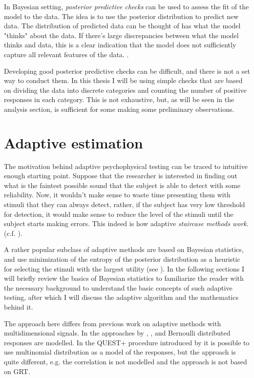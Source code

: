 \documentclass{article}\usepackage{knitr}
\begin{document}
In Bayesian setting, \textit{posterior predictive checks} can be used to assess the fit of the model to the data. The idea is to use the posterior distribution to predict new data. The distribution of predicted data can be thought of has what the model "thinks" about the data. If there's large discrepancies between what the model thinks and data, this is a clear indication that the model does not sufficiently capture all relevant features of the data. \citep[Chapter 7]{bda}.

Developing good posterior predictive checks can be difficult, and there is not a set way to conduct them. In this thesis I will be using simple checks that are based on dividing the data into discrete categories and counting the number of positive responses in each category. This is not exhaustive, but, as will be seen in the analysis section, is sufficient for some making some preliminary observations. 


\newpage


\section{Adaptive estimation}

The motivation behind adaptive psychophysical testing can be traced to intuitive enough starting point. Suppose that the researcher is interested in finding out what is the faintest possible sound that the subject is able to detect with some reliability. Now, it wouldn't make sense to waste time presenting them with stimuli that they can always detect, rather, if the subject has very low threshold for detection, it would make sense to reduce the level of the stimuli until the subject starts making errors. This indeed is how adaptive \textit{staircase methods work}. (c.f. \citet[Chapter 5]{kingdomprins2010}).

A rather popular subclass of adaptive methods are based on Bayesian statistics, and use minimization of the entropy of the posterior distribution as a heuristic for selecting the stimuli with the largest utility (see \citet{kontsevichtyler1999}). In the following sections I will briefly review the basics of Bayesian statistics to familiarize the reader with the necessary background to understand the basic concepts of such adaptive testing, after which I will discuss the adaptive algorithm and the mathematics behind it.

The approach here differs from previous work on adaptive methods with multidimensional signals. In the approaches by \citet{dimattina2015}, \citet{lesmes2006}, \citet{shen2013, shen2014} and \citet{kujalalukka2006} Bernoulli distributed responses are modelled. In the QUEST+ procedure introduced by \citet{watson2017} it is possible to use multinomial distribution as a model of the responses, but the approach is quite different, e.g. the correlation is not modelled and the approach is not based on GRT.
\end{document}
